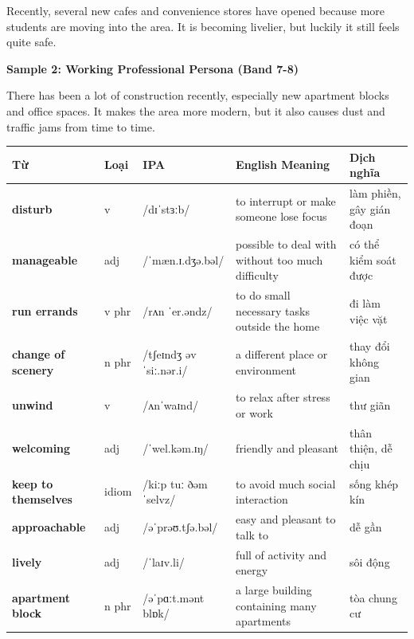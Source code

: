 Recently, several new cafes and convenience stores have opened because more students are moving into the area. It is becoming livelier, but luckily it still feels quite safe.

\textbf{Sample 2: Working Professional Persona (Band 7-8)}

There has been a lot of construction recently, especially new apartment blocks and office spaces. It makes the area more modern, but it also causes dust and traffic jams from time to time.

\separator


\vspace{0.8em}
\begin{center}
\renewcommand{\arraystretch}{1.65}
\begin{tabularx}{\textwidth}{|V{0.22\textwidth}|C{0.07\textwidth}|I{0.20\textwidth}|Y|V{0.18\textwidth}|}
\hline
{}
\textbf{Từ} & \textbf{Loại} & \textbf{IPA} & \textbf{English Meaning} & \textbf{Dịch nghĩa} \\
\hline
\textbf{disturb} & v & /dɪˈstɜːb/ & to interrupt or make someone lose focus & làm phiền, gây gián đoạn \\ \hline
\textbf{manageable} & adj & /ˈmæn.ɪ.dʒə.bəl/ & possible to deal with without too much difficulty & có thể kiểm soát được \\ \hline
\textbf{run errands} & v phr & /rʌn ˈer.əndz/ & to do small necessary tasks outside the home & đi làm việc vặt \\ \hline
\textbf{change of scenery} & n phr & /tʃeɪndʒ əv ˈsiː.nər.i/ & a different place or environment & thay đổi không gian \\ \hline
\textbf{unwind} & v & /ʌnˈwaɪnd/ & to relax after stress or work & thư giãn \\ \hline
\textbf{welcoming} & adj & /ˈwel.kəm.ɪŋ/ & friendly and pleasant & thân thiện, dễ chịu \\ \hline
\textbf{keep to themselves} & idiom & /kiːp tuː ðəmˈselvz/ & to avoid much social interaction & sống khép kín \\ \hline
\textbf{approachable} & adj & /əˈprəʊ.tʃə.bəl/ & easy and pleasant to talk to & dễ gần \\ \hline
\textbf{lively} & adj & /ˈlaɪv.li/ & full of activity and energy & sôi động \\ \hline
\textbf{apartment block} & n phr & /əˈpɑːt.mənt blɒk/ & a large building containing many apartments & tòa chung cư \\ \hline
\end{tabularx}
\end{center}

